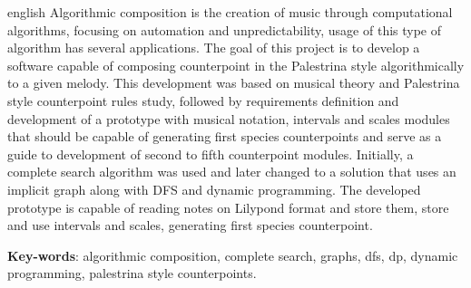 \begin{resumo}[Abstract]
 \begin{otherlanguage*}{english}
   Algorithmic composition is the creation of music through computational algorithms, focusing on automation and unpredictability, usage of this type of algorithm has several applications. The goal of this project is to develop a software capable of composing counterpoint in the Palestrina style algorithmically to a given melody. This development was based on musical theory and Palestrina style counterpoint rules study, followed by requirements definition and development of a prototype with musical notation, intervals and scales modules that should be capable of generating first species counterpoints and serve as a guide to development of second to fifth counterpoint modules. Initially, a complete search algorithm was used and later changed to a solution that uses an implicit graph along with DFS and dynamic programming. The developed prototype is capable of reading notes on Lilypond format and store them, store and use intervals and scales, generating first species counterpoint.

   \vspace{\onelineskip}

   \noindent
   \textbf{Key-words}: algorithmic composition, complete search, graphs, dfs, dp, dynamic programming, palestrina style counterpoints.
 \end{otherlanguage*}
\end{resumo}
